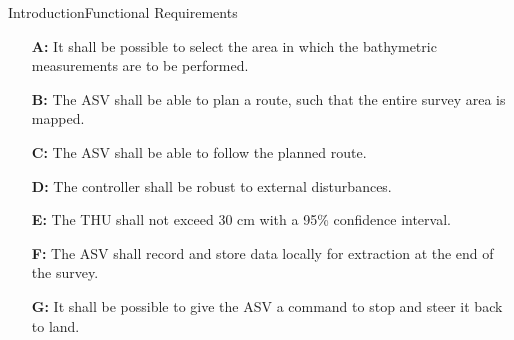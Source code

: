 \begin{frame}{Introduction}{Functional Requirements}
    \begin{itemize}
        \item[\textbf{A:}] It shall be possible to select the area in which the bathymetric measurements are to be performed.
        \item[\textbf{B:}] The ASV shall be able to plan a route, such that the entire survey area is mapped.
        \item[\textbf{C:}] The ASV shall be able to follow the planned route.
        \item[\textbf{D:}] The controller shall be robust to external disturbances.
        \item[\textbf{E:}] The THU shall not exceed 30 cm with a 95\% confidence interval.
        \item[\textbf{F:}] The ASV shall record and store data locally for extraction at the end of the survey.
        \item[\textbf{G:}] It shall be possible to give the ASV a command to stop and steer it back to land.
    \end{itemize}
\end{frame}

